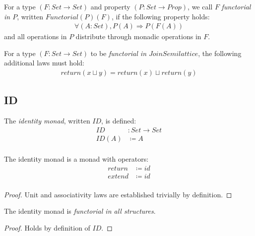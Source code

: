 \documentclass{article}
\begin{document}
\begin{definition}
For a type $(F : Set → Set)$ and property $(P : Set → Prop)$, we call $F$ \emph{functorial in $P$}, written $Functorial(P)(F)$, if the following property holds:
\begin{align*}
∀ (A : Set), P(A) ⇒ P (F(A))
\end{align*}
and all operations in $P$ distribute through monadic operations in $F$.
\end{definition}

\begin{example}
For a type $(F : Set → Set)$ to be \emph{functorial in $JoinSemilattice$}, the following additional laws must hold:
\begin{align*}
return (x ⊔ y) = return(x) ⊔ return(y)
\end{align*}
\end{example}


\subsection{ID}
\label{section:Proofs:ID}

\begin{definition}
The \emph{identity monad}, written $ID$, is defined:
\begin{align*}
   ID &: Set → Set \\
ID(A) &≔ A         \\
\end{align*}
\end{definition}

\begin{lemma}
The identity monad is a monad with operators:
\begin{align*}
return &≔ id \\
extend &≔ id \\
\end{align*}
\begin{proof}
Unit and associativity laws are established trivially by definition.
\end{proof}
\end{lemma}

\begin{lemma}
The identity monad is \emph{functorial in all structures}.
\begin{proof}
Holds by definition of $ID$.
\end{proof}
\end{lemma}
\end{document}
